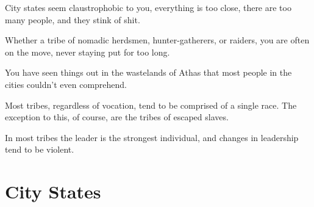 \begin{multicols}{2}
\begin{description}
    \item City states seem claustrophobic to you, everything is too close, there are too many people, and they stink of shit.
    \item Whether a tribe of nomadic herdsmen, hunter-gatherers, or raiders, you are often on the move, never staying put for too long.
    \item You have seen things out in the wastelands of Athas that most people in the cities couldn’t even comprehend.
    \item Most tribes, regardless of vocation, tend to be comprised of a single race. The exception to this, of course, are the tribes of escaped slaves.
    \item In most tribes the leader is the strongest individual, and changes in leadership tend to be violent.
\end{description}

\end{multicols}

\section{City States}

